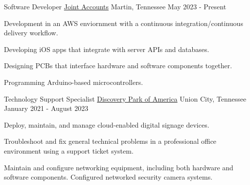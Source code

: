 
\begin{cventries}


  \cventry
    {Software Developer}
    {\href{https://www.jointaccounts.com}{Joint Accounts}}
    {Martin, Tennessee}
    {May 2023 - Present}
    {
		\begin{cvitems}
      		\item Development in an AWS enviornment with a continuous integration/continuous delivery workflow.
      		\item Developing iOS apps that integrate with server APIs and databases.
      		\item Designing PCBs that interface hardware and software components together.
      		\item Programming Arduino-based microcontrollers. 
		\end{cvitems}
   	}


  \cventry
    {Technology Support Specialist}
    {\href{https://discoveryparkofamerica.com/}{Discovery Park of America}}
    {Union City, Tennessee}
    {January 2021 - August 2023}
    {
      \begin{cvitems}
        \item Deploy, maintain, and manage cloud-enabled digital signage devices.
        \item Troubleshoot and fix general technical problems in a professional office environment using a support ticket system.
        \item Maintain and configure networking equipment, including both hardware and software components. Configured networked security camera systems.
      \end{cvitems}
    }

\end{cventries}
